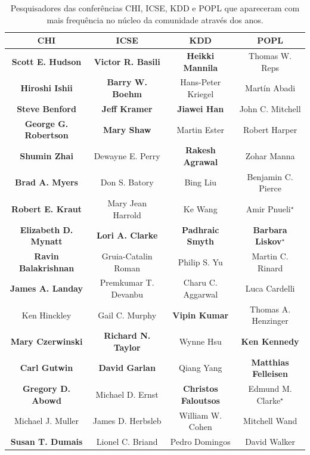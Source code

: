 \begin{table}[!hptb]
\centering
\caption{Pesquisadores das conferências CHI, ICSE, KDD e POPL que apareceram com mais 
frequência no núcleo da comunidade através dos anos.}
\label{tab:authors_frequency_core_community_grupo1}
{\fontsize{9.2}{11}\selectfont
\begin{tabular}{|c|c|c|c|} \hline
\textbf{CHI} & \textbf{ICSE} & \textbf{KDD} & \textbf{POPL}\\ \hline
\textbf{Scott E. Hudson} & \textbf{Victor R. Basili} & \textbf{Heikki Mannila} & Thomas W. Reps\\ \hline
\textbf{Hiroshi Ishii} & \textbf{Barry W. Boehm} & Hans-Peter Kriegel & Martín Abadi\\ \hline
\textbf{Steve Benford} & \textbf{Jeff Kramer} & \textbf{Jiawei Han} & John C. Mitchell\\ \hline
\textbf{George G. Robertson} & \textbf{Mary Shaw} & Martin Ester & Robert Harper\\ \hline
\textbf{Shumin Zhai} & Dewayne E. Perry & \textbf{Rakesh Agrawal} & Zohar Manna\\ \hline
\textbf{Brad A. Myers} & Don S. Batory & Bing Liu & Benjamin C. Pierce\\ \hline
\textbf{Robert E. Kraut} & Mary Jean Harrold & Ke Wang & Amir Pnueli$^\star$\\ \hline
\textbf{Elizabeth D. Mynatt} & \textbf{Lori A. Clarke} & \textbf{Padhraic Smyth} & \textbf{Barbara Liskov}$^\star$\\ \hline
\textbf{Ravin Balakrishnan} & Gruia-Catalin Roman & Philip S. Yu & Martin C. Rinard\\ \hline
\textbf{James A. Landay} & Premkumar T. Devanbu & Charu C. Aggarwal & Luca Cardelli\\ \hline
Ken Hinckley & Gail C. Murphy & \textbf{Vipin Kumar} & Thomas A. Henzinger\\ \hline
\textbf{Mary Czerwinski} & \textbf{Richard N. Taylor} & Wynne Hsu & \textbf{Ken Kennedy}\\ \hline
\textbf{Carl Gutwin} & \textbf{David Garlan} & Qiang Yang & \textbf{Matthias Felleisen}\\ \hline
\textbf{Gregory D. Abowd} & Michael D. Ernst & \textbf{Christos Faloutsos} & Edmund M. Clarke$^\star$\\ \hline
Michael J. Muller & James D. Herbsleb & William W. Cohen & Mitchell Wand\\ \hline
\textbf{Susan T. Dumais} & Lionel C. Briand & Pedro Domingos & David Walker\\ \hline

\end{tabular}}
\end{table}
